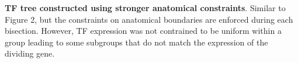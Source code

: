 \textbf{TF tree constructed using stronger anatomical constraints}. 
Similar to Figure 2, but the constraints on anatomical boundaries are enforced during each bisection. However, TF expression was not contrained to be uniform within a group leading to some subgroups that do not match the expression of the dividing gene.
